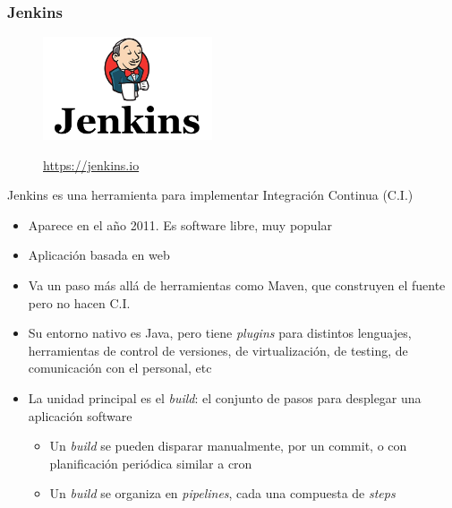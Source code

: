 \documentclass[ucs]{beamer}
\begin{document}
\begin{frame}[fragile]
\frametitle{Jenkins}
\begin{figure}
\centerline{\includegraphics[width=5cm]{figs/logo_jenkins}}
\url{https://jenkins.io}
\end{figure}

Jenkins es una herramienta para implementar
Integración Continua (C.I.)
\begin{itemize}
\item
Aparece en el año 2011. Es software libre, muy popular

\item
Aplicación basada en web

\end{itemize}
\end{frame}
\begin{frame}[fragile]
\begin{itemize}
\item
Va un paso más allá de herramientas como Maven, que construyen
el fuente pero no hacen C.I.

\item
Su entorno nativo es Java, pero tiene
\emph{plugins} para distintos lenguajes,
herramientas de control de versiones, de virtualización, de testing, de
comunicación con el personal, etc

\item
La unidad principal es el 
\emph{build}: el conjunto de pasos para desplegar una aplicación software 

\begin{itemize}
\item
Un \emph{build}
se pueden disparar manualmente, por un commit, o
con planificación periódica similar a cron

\item
Un \emph{build}
se organiza  en
\emph{pipelines},
cada una compuesta de
\emph{steps}
\end{itemize}
\end{itemize}

\end{frame}
\end{document}
